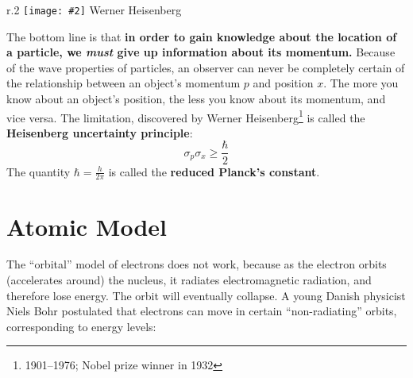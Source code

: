 \documentclass[11pt]{article}
\newcommand{\pic}[2]{\texttt{[image: \#2]}}
\begin{document}
\begin{wrapfigure}{r}{.2\textwidth}
  \centering
  \pic{.2}{Heisenberg.jpg}
  Werner Heisenberg
\end{wrapfigure}
The bottom line is that \textbf{in order to gain knowledge about the location
  of a particle, we \emph{must} give up information about its momentum.}
Because of the wave properties of particles, an observer can never be completely
certain of the relationship between an object's momentum $p$ and position $x$.
The more you know about an object's position, the less you know about its
momentum, and vice versa. The limitation, discovered by Werner
Heisenberg\footnote{1901--1976; Nobel prize winner in 1932} is called the
\textbf{Heisenberg uncertainty principle}:
\begin{equation}
  \boxed{\sigma_p\sigma_x\geq \frac{\hbar}{2}}
\end{equation}
The quantity $\displaystyle\hbar=\frac{h}{2\pi}$ is called the
\textbf{reduced Planck's constant}.

\section{Atomic Model}
The ``orbital'' model of electrons does not work, because as the electron
orbits (accelerates around) the nucleus, it radiates electromagnetic radiation,
and therefore lose energy. The orbit will eventually collapse. A young Danish
physicist Niels Bohr postulated that electrons can move in certain
``non-radiating'' orbits, corresponding to energy levels:
\end{document}
